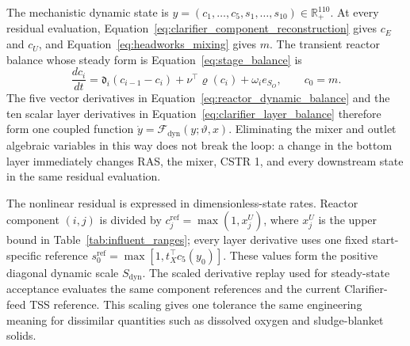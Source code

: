 \documentclass[a4paper,fleqn]{cas-sc}
\newcommand{\R}{\mathbb{R}}
\begin{document}
The mechanistic dynamic state is $y=(c_1,\ldots,c_5,s_1,\ldots,s_{10})\in\R_+^{110}$. At every residual evaluation, Equation~\eqref{eq:clarifier_component_reconstruction} gives $c_E$ and $c_U$, and Equation~\eqref{eq:headworks_mixing} gives $m$. The transient reactor balance whose steady form is Equation~\eqref{eq:stage_balance} is
\begin{equation}
\label{eq:reactor_dynamic_balance}
\frac{dc_i}{dt}=\mathfrak d_i(c_{i-1}-c_i)+\nu^\top\varrho(c_i)+\omega_i e_{S_O},
\qquad c_0=m.
\end{equation}
The five vector derivatives in Equation~\eqref{eq:reactor_dynamic_balance} and the ten scalar layer derivatives in Equation~\eqref{eq:clarifier_layer_balance} therefore form one coupled function $\dot y=\mathcal F_{\mathrm{dyn}}(y;\vartheta,x)$. Eliminating the mixer and outlet algebraic variables in this way does not break the loop: a change in the bottom layer immediately changes RAS, the mixer, CSTR 1, and every downstream state in the same residual evaluation.

The nonlinear residual is expressed in dimensionless-state rates. Reactor component $(i,j)$ is divided by $c_j^{\mathrm{ref}}=\max(1,x_j^U)$, where $x_j^U$ is the upper bound in Table~\ref{tab:influent_ranges}; every layer derivative uses one fixed start-specific reference $s_0^{\mathrm{ref}}=\max[1,t_X^\top c_5(y_0)]$. These values form the positive diagonal dynamic scale $S_{\mathrm{dyn}}$. The scaled derivative replay used for steady-state acceptance evaluates the same component references and the current Clarifier-feed TSS reference. This scaling gives one tolerance the same engineering meaning for dissimilar quantities such as dissolved oxygen and sludge-blanket solids.
\end{document}

